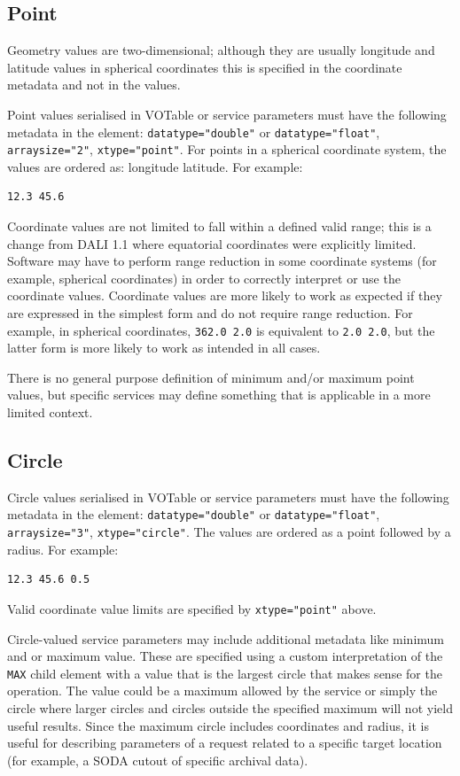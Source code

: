 \documentclass[11pt,letter]{ivoa}
\begin{document}
\subsection{Point}
Geometry values are two-dimensional; although they are usually longitude and
latitude values in spherical coordinates this is specified in the coordinate
metadata and not in the values.

Point values serialised in VOTable or service parameters must have the following metadata in the
 element: \verb|datatype="double"| or \verb|datatype="float"|, \verb|arraysize="2"|,
\verb|xtype="point"|. For points in a
spherical coordinate system, the values are ordered as: longitude latitude. For
example:

\begin{verbatim}
12.3 45.6
\end{verbatim}

Coordinate values are not limited to fall within a defined valid range; this is a change from
DALI 1.1 where equatorial coordinates were explicitly limited. Software may have
to perform range reduction in some coordinate systems (for example, spherical coordinates) in 
order to correctly interpret or use the coordinate values. Coordinate values are more likely to
work as expected if they are expressed in the simplest form and do not require range reduction.
For example, in spherical coordinates, \verb|362.0 2.0| is equivalent to \verb|2.0 2.0|, but the
latter form is more likely to work as intended in all cases.

There is no general purpose definition of minimum and/or maximum point values, but
specific services may define something that is applicable in a more limited context.

\subsection{Circle}
Circle values serialised in VOTable or service parameters must have the following metadata in the
 element: \verb|datatype="double"| or \verb|datatype="float"|, \verb|arraysize="3"|,
\verb|xtype="circle"|. 
The values are ordered as a point followed by a radius. For example:

\begin{verbatim}
12.3 45.6 0.5
\end{verbatim}

Valid coordinate value limits are specified by \verb|xtype="point"| above.

Circle-valued service parameters may include additional metadata like minimum and
or maximum value. These are specified using a custom interpretation of the
\verb|MAX| child element with a value that is the largest circle that makes sense
for the operation. The value could be a maximum allowed by the service or simply
the circle where larger circles and circles outside the specified maximum will not
yield useful results. Since the maximum circle includes coordinates and radius,
it is useful for describing parameters of a request related to a specific target
location (for example, a SODA cutout of specific archival data).
\end{document}
